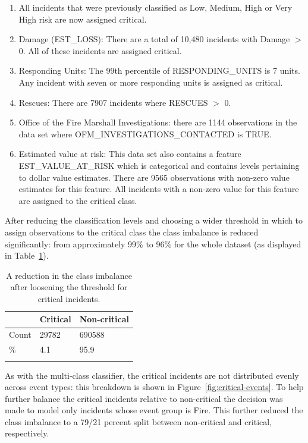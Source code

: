\documentclass[12pt,letterpaper, oneside]
{article}
\begin{document}
\begin{enumerate}
	\item All incidents that were previously classified as Low, Medium, High or Very High risk are now assigned critical. 

	\item Damage (EST\_LOSS): There are a total of 10,480 incidents with Damage $>$ 0. All of these incidents are assigned critical. 

	\item Responding Units: The 99th percentile of RESPONDING\_UNITS is 7 units. Any incident with seven or more responding units is assigned as critical.

	\item Rescues: There are 7907 incidents where RESCUES $>$ 0.

	\item Office of the Fire Marshall Investigations: there are 1144 observations in the data set where OFM\_INVESTIGATIONS\_CONTACTED is TRUE. 

	\item Estimated value at risk: This data set also contains a feature EST\_VALUE\_AT\_RISK which is categorical and contains levels pertaining to dollar value estimates. There are 9565 observations with non-zero value estimates for this feature. All incidents with a non-zero value for this feature are assigned to the critical class.

\end{enumerate}

After reducing the classification levels and choosing a wider threshold in which to assign observations to the critical class the class imbalance is reduced significantly: from approximately 99\% to 96\% for the whole dataset (as displayed in Table~\ref{tab:class-imbal}). 

\begin{table}
		\begin{tabular}{l l l} \toprule
			 	& Critical & Non-critical \\ \midrule
			Count & 29782 & 690588 \\
			\% & 4.1 & 95.9 \\
			\caption{
				A reduction in the class imbalance after loosening the threshold for critical incidents.
				\label{tab:class-imbal}
			}
		\end{tabular}
\end{table}

As with the multi-class classifier, the critical incidents are not distributed evenly across event types: this breakdown is shown in Figure~\ref{fig:critical-events}. To help further balance the critical incidents relative to non-critical the decision was made to model only incidents whose event group is Fire. This further reduced the class imbalance to a 79/21 percent split between non-critical and critical, respectively.
\end{document}
